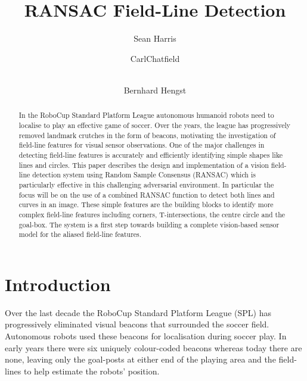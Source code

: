 \documentclass[runningheads,a4paper]{llncs}
\begin{document}
\mainmatter

\title{RANSAC Field-Line Detection}


\author{Sean Harris \and CarlChatfield \and \\
    Bernhard Hengst}



\maketitle


\begin{abstract}
In the RoboCup Standard Platform League autonomous humanoid robots need to localise to play an effective game of soccer. Over the years, the league has progressively removed landmark crutches in the form of beacons, motivating the investigation of field-line features for visual sensor observations. One of the major challenges in detecting field-line features is accurately and efficiently identifying simple shapes like lines and circles. This paper describes the design and implementation of a vision field-line detection system using Random Sample Consensus (RANSAC) which is particularly effective in this challenging adversarial environment. In particular the focus will be on the use of a combined RANSAC function to detect both lines and curves in an image. These simple features are the building blocks to identify more complex field-line features including corners, T-intersections, the centre circle and the goal-box. The system is a first step towards building a complete vision-based sensor model for the aliased field-line features.  
\end{abstract}

\section{Introduction}

Over the last decade the RoboCup Standard Platform League (SPL) has progressively eliminated visual beacons that surrounded the soccer field. Autonomous robots used these beacons for localisation during soccer play. In early years there were six uniquely colour-coded beacons whereas today there are none, leaving only the goal-posts at either end of the playing area and the field-lines to help estimate the robots' position. 
\end{document}
